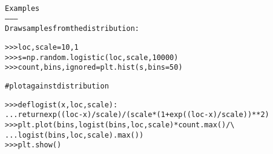 \begin{boxedminipage}{\funcwidth}
\begin{alltt}
Examples
--------
Draw samples from the distribution:

{\textgreater}{\textgreater}{\textgreater} loc, scale = 10, 1
{\textgreater}{\textgreater}{\textgreater} s = np.random.logistic(loc, scale, 10000)
{\textgreater}{\textgreater}{\textgreater} count, bins, ignored = plt.hist(s, bins=50)

\#   plot against distribution

{\textgreater}{\textgreater}{\textgreater} def logist(x, loc, scale):
...     return exp((loc-x)/scale)/(scale*(1+exp((loc-x)/scale))**2)
{\textgreater}{\textgreater}{\textgreater} plt.plot(bins, logist(bins, loc, scale)*count.max()/{\textbackslash}
... logist(bins, loc, scale).max())
{\textgreater}{\textgreater}{\textgreater} plt.show()
\end{alltt}

\setlength{\parskip}{1ex}
    \end{boxedminipage}

    \label{trunk:qstkutil:bollinger:lognormal}

    \vspace{0.5ex}

